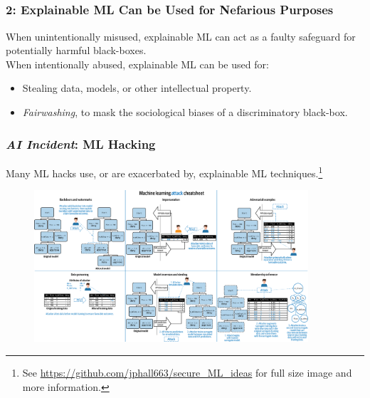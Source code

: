 \documentclass[11pt,aspectratio=169,hyperref={colorlinks}]{beamer}
\begin{document}
	\subsection*{} %

	\begin{frame}
	
		\frametitle{2: Explainable ML Can be Used for \textbf{Nefarious Purposes}}	
		\Large
		When unintentionally misused, explainable ML can act as a faulty safeguard for potentially harmful black-boxes.\\
		\vspace{10pt}
		When intentionally abused, explainable ML can be used for: 
		\begin{itemize}
			\item Stealing data, models, or other intellectual property.
			\item \textit{Fairwashing}, to mask the sociological biases of a discriminatory black-box.
		\end{itemize}
	
	\end{frame}

	\begin{frame}
	
		\frametitle{\textit{\textbf{AI Incident}}: ML Hacking}
		
\footnotesize{Many ML hacks use, or are exacerbated by, explainable ML techniques.}\footnote{\tiny{See \url{https://github.com/jphall663/secure_ML_ideas} for full size image and more information.}}
				\begin{figure}
					\begin{center}
						\includegraphics[height=160pt]{../img/Attack_Cheat_Sheet.png}
					\end{center}
				\end{figure}	
				\normalsize
	
	\end{frame}
	
\end{document}
